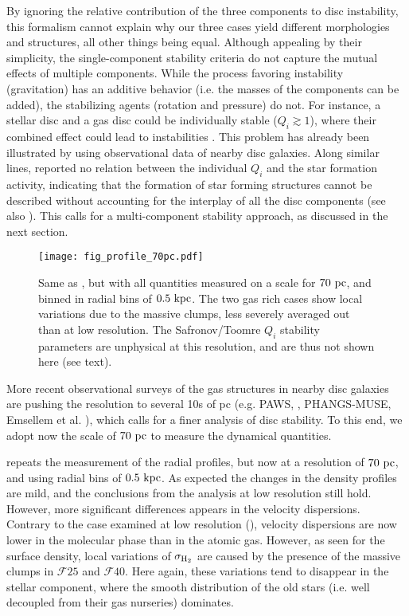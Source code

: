 \documentclass[useAMS,usenatbib]{mnras}
\newcommand{\gm}{\ensuremath{\mathcal{F}25}\xspace}
\newcommand{\gl}{\ensuremath{\mathcal{F}40}\xspace}
\begin{document}
By ignoring the relative contribution of the three components to disc instability, this formalism cannot explain why our three cases yield different morphologies and structures, all other things being equal. Although appealing by their simplicity, the single-component stability criteria do not capture the mutual effects of multiple components. While the process favoring instability (gravitation) has an additive behavior (i.e. the masses of the components can be added), the stabilizing agents (rotation and pressure) do not. For instance, a stellar disc and a gas disc could be individually stable ($Q_i \gtrsim 1$), where their combined effect could lead to instabilities \citep[e.g.][]{Lin1966, Jog1984}. This problem has already been illustrated by \citet[][his figure 1]{Romeo2020} using observational data of nearby disc galaxies. Along similar lines, \citet{Westfall2014} reported no relation between the individual $Q_i$ and the star formation activity, indicating that the formation of star forming structures cannot be described without accounting for the interplay of all the disc components (see also \citealt{Leroy2008}). This calls for a multi-component stability approach, as discussed in the next section.

\begin{figure}
\centering
\texttt{[image: fig\_profile\_70pc.pdf]}
\caption{Same as , but with all quantities measured on a scale for $70\mathrm{~pc}$, and binned in radial bins of $0.5 \mathrm{~kpc}$. The two gas rich cases show local variations due to the massive clumps, less severely averaged out than at low resolution. The Safronov/Toomre $Q_i$ stability parameters are unphysical at this resolution, and are thus not shown here (see text).}
\label{fig:profile}
\end{figure}

More recent observational surveys of the gas structures in nearby disc galaxies are pushing the resolution to several 10s of pc (e.g. PAWS, \citealt{Schinnerer2013}, PHANGS-MUSE, Emsellem et al. \inprep), which calls for a finer analysis of disc stability. To this end, we adopt now the scale of $70 \mathrm{~pc}$ to measure the dynamical quantities.

 repeats the measurement of the radial profiles, but now at a resolution of $70 \mathrm{~pc}$, and using radial bins of $0.5 \mathrm{~kpc}$. As expected the changes in the density profiles are mild, and the conclusions from the analysis at low resolution still hold. However, more significant differences appears in the velocity dispersions. Contrary to the case examined at low resolution (), velocity dispersions are now lower in the molecular phase than in the atomic gas. However, as seen for the surface density, local variations of $\sigma_{\mathrm{H}_2}$ are caused by the presence of the massive clumps in \gm and \gl. Here again, these variations tend to disappear in the stellar component, where the smooth distribution of the old stars (i.e. well decoupled from their gas nurseries) dominates.
\end{document}
